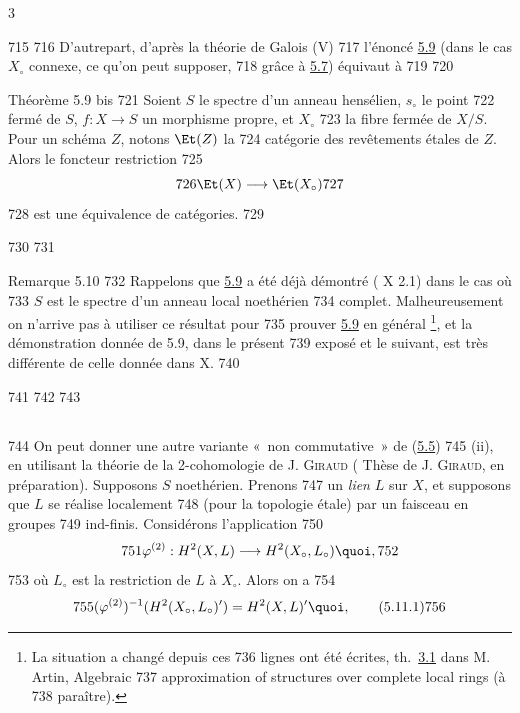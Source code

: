 3	\documentclass[10pt]{../fichiers-configuration-latex/smfart}
\begin{document}
   715	
   716	D'autre\pageoriginale part, d'après la théorie de Galois (\SGA V)
   717	l'énoncé \hyperref[XII.thm5.9]{5.9} (dans le cas $X_{\circ}$ connexe, ce qu'on peut supposer,
   718	grâce à \hyperref[XII.cor5.7]{5.7}) équivaut à
   719	
   720	\begin{enonce*}{Théorème 5.9 bis}
   721	Soient $S$ le spectre d'un anneau hensélien, $s_{\circ}$ le point
   722	fermé de $S$, $f:X\rightarrow S$ un morphisme propre, et $X_{\circ}$
   723	la fibre fermée de $X/S$. Pour un schéma $Z$, notons $\Et(Z)$ la
   724	catégorie des revêtements étales de $Z$. Alors le foncteur restriction
   725	$$
   726	\Et(X)\longrightarrow \Et(X_{\circ})
   727	$$
   728	est une équivalence de catégories.
   729	\end{enonce*}
   730	
   731	\begin{enonce*}[remark]{Remarque 5.10}
   732	Rappelons que \hyperref[XII.thm5.9]{5.9} a été déjà démontré ( X 2.1) dans le cas où
   733	$S$ est le spectre d'un anneau local noethérien
   734	complet. Malheureusement on n'arrive pas à utiliser ce résultat pour
   735	prouver \hyperref[XII.thm5.9]{5.9} en général \footnote[1]{La situation a changé depuis ces
   736	  lignes ont été écrites, \cf th.~\hyperref[XII.prop3.1]{3.1} dans M. Artin, Algebraic
   737	  approximation of structures over complete local rings (à
   738	  paraître).}, et la démonstration donnée de 5.9, dans le présent
   739	exposé et le suivant, est très différente de celle donnée dans  X.
   740	\end{enonce*}
   741	
   742	\setcounter{subsection}{10}
   743	\subsection{}
   744	On peut donner une autre variante « non commutative »  de (\hyperref[XII.cor5.5]{5.5})
   745	(ii), en utilisant la théorie de la 2-cohomologie de J. \textsc{Giraud} (	Thèse de J. \textsc{Giraud}, en préparation). Supposons $S$ noethérien. Prenons
   747	un \emph{lien} $L$ sur $X$, et supposons que $L$ se réalise localement
   748	(pour la topologie étale) par un faisceau en groupes
   749	ind-finis. Considérons l'application
   750	$$
   751	\varphi^{(2)}:H^2(X,L)\longrightarrow H^2(X_{\circ},L_{\circ}){\quoi},
   752	$$
   753	où $L_{\circ}$ est la restriction de $L$ à $X_{\circ}$. Alors on a
   754	\begin{equation*}
   755	(\varphi^{(2)})^{-1}(H^2(X_{\circ},L_{\circ})')=H^2(X,L)'{\quoi},\tag{5.11.1}
   756	\end{equation*}
\end{document}
